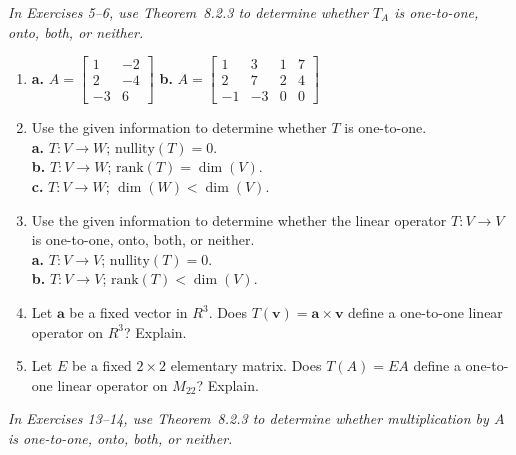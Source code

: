 \documentclass{article}
\begin{document}
\noindent\textit{In Exercises 5--6, use Theorem~8.2.3 to determine whether $T_A$ is
one-to-one, onto, both, or neither.}

\begin{enumerate}
  \item[5.] \textbf{a.} $A = \begin{bmatrix}1&-2\\2&-4\\-3&6\end{bmatrix}$
        \quad \textbf{b.} $A = \begin{bmatrix}1&3&1&7\\2&7&2&4\\-1&-3&0&0\end{bmatrix}$

  \item[7.] Use the given information to determine whether $T$ is one-to-one.\\
        \textbf{a.} $T : V \to W$; $\text{nullity}(T) = 0$.\\
        \textbf{b.} $T : V \to W$; $\text{rank}(T) = \dim(V)$.\\
        \textbf{c.} $T : V \to W$; $\dim(W) < \dim(V)$.

  \item[8.] Use the given information to determine whether the linear operator $T : V \to V$
        is one-to-one, onto, both, or neither.\\
        \textbf{a.} $T : V \to V$; $\text{nullity}(T) = 0$.\\
        \textbf{b.} $T : V \to V$; $\text{rank}(T) < \dim(V)$.

  \item[11.] Let $\mathbf{a}$ be a fixed vector in $R^3$. Does $T(\mathbf{v}) = \mathbf{a}\times\mathbf{v}$
        define a one-to-one linear operator on $R^3$? Explain.

  \item[12.] Let $E$ be a fixed $2\times 2$ elementary matrix. Does $T(A) = EA$ define a
        one-to-one linear operator on $M_{22}$? Explain.

\end{enumerate}

\noindent\textit{In Exercises 13--14, use Theorem~8.2.3 to determine whether multiplication
by $A$ is one-to-one, onto, both, or neither.}
\end{document}
